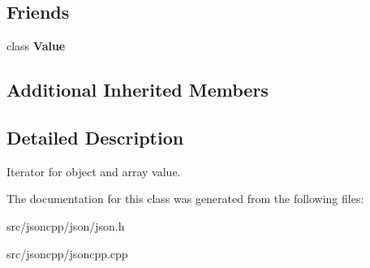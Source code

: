 \subsection*{Friends}
\begin{DoxyCompactItemize}
\item 
class {\bfseries Value}\hypertarget{classJson_1_1ValueIterator_aeceedf6e1a7d48a588516ce2b1983d6f}{}\label{classJson_1_1ValueIterator_aeceedf6e1a7d48a588516ce2b1983d6f}

\end{DoxyCompactItemize}
\subsection*{Additional Inherited Members}


\subsection{Detailed Description}
Iterator for object and array value. 

The documentation for this class was generated from the following files\+:\begin{DoxyCompactItemize}
\item 
src/jsoncpp/json/json.\+h\item 
src/jsoncpp/jsoncpp.\+cpp\end{DoxyCompactItemize}
